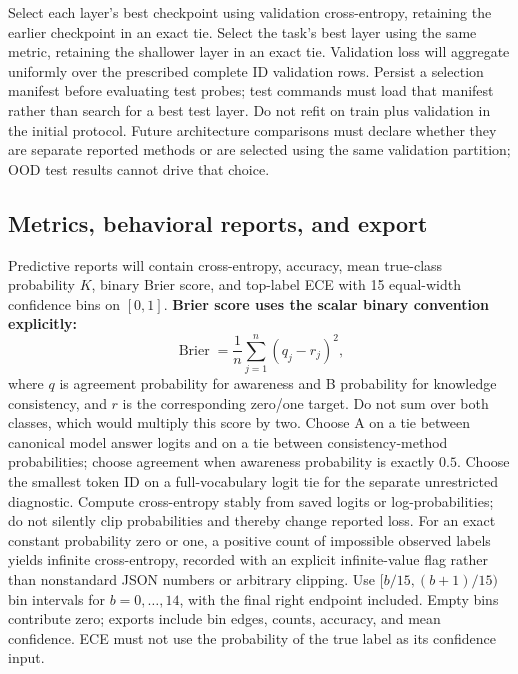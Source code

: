 \documentclass[11pt]{article}
\begin{document}
Select each layer's best checkpoint using validation cross-entropy, retaining the earlier checkpoint in an exact tie.
Select the task's best layer using the same metric, retaining the shallower layer in an exact tie.
Validation loss will aggregate uniformly over the prescribed complete ID validation rows.
Persist a selection manifest before evaluating test probes; test commands must load that manifest rather than search for a best test layer.
Do not refit on train plus validation in the initial protocol.
Future architecture comparisons must declare whether they are separate reported methods or are selected using the same validation partition; OOD test results cannot drive that choice.

\subsection{Metrics, behavioral reports, and export}

Predictive reports will contain cross-entropy, accuracy, mean true-class probability $K$, binary Brier score, and top-label ECE with 15 equal-width confidence bins on $[0,1]$.
\textbf{Brier score uses the scalar binary convention explicitly:}
\begin{equation}
\operatorname{Brier}=\frac1n\sum_{j=1}^n(q_j-r_j)^2,
\end{equation}
where $q$ is agreement probability for awareness and B probability for knowledge consistency, and $r$ is the corresponding zero/one target.
Do not sum over both classes, which would multiply this score by two.
Choose A on a tie between canonical model answer logits and on a tie between consistency-method probabilities; choose agreement when awareness probability is exactly $0.5$.
Choose the smallest token ID on a full-vocabulary logit tie for the separate unrestricted diagnostic.
Compute cross-entropy stably from saved logits or log-probabilities; do not silently clip probabilities and thereby change reported loss.
For an exact constant probability zero or one, a positive count of impossible observed labels yields infinite cross-entropy, recorded with an explicit infinite-value flag rather than nonstandard JSON numbers or arbitrary clipping.
Use $[b/15,(b+1)/15)$ bin intervals for $b=0,\ldots,14$, with the final right endpoint included.
Empty bins contribute zero; exports include bin edges, counts, accuracy, and mean confidence.
ECE must not use the probability of the true label as its confidence input.
\end{document}
